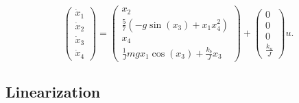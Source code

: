 \[
\begin{pmatrix}\dot{x}_{1}\\
\dot{x}_{2}\\
\dot{x}_{3}\\
\dot{x}_{4}
\end{pmatrix}=\begin{pmatrix}x_{2}\\
\frac{5}{7}\left(-g\sin(x_{3})+x_{1}x_{4}^{2}\right)\\
x_{4}\\
\frac{1}{J}mgx_{1}\cos(x_3)+\frac{k_b}{J}x_3
\end{pmatrix}+\begin{pmatrix}0\\
0\\
0\\
\frac{k_{u}}{J}
\end{pmatrix}u.
\]

\subsection{Linearization}

